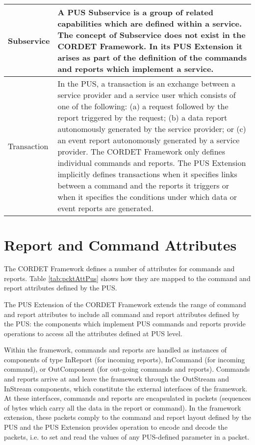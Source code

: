 \documentclass{pnp_article}
\begin{document}
\begin{longtable}{|l|>{\raggedright\arraybackslash}p{10cm}|}
\hline
Subservice & A PUS Subservice is a group of related capabilities which are defined within a service. The concept of Subservice does not exist in the CORDET Framework. In its PUS Extension it arises as part of the definition of the commands and reports which implement a service. \\
\hline
Transaction & In the PUS, a transaction is an exchange between a service provider and a service user which consists of one of the following: (a) a request followed by the report triggered by the request; (b) a data report autonomously generated by the service provider; or (c) an event report autonomously generated by a service provider. The CORDET Framework only defines individual commands and reports. The PUS Extension implicitly defines transactions when it specifies links between a command and the reports it triggers or when it specifies the conditions under which data or event reports are generated. \\
\hline
\end{longtable} 


\section{Report and Command Attributes}\label{sec:repCmdAttr}
The CORDET Framework defines a number of attributes for commands and reports. Table \ref{tab:pcktAttPus} shows how they are mapped to the command and report attributes defined by the PUS. 

The PUS Extension of the CORDET Framework extends the range of command and report attributes to include all command and report attributes defined by the PUS: the components which implement PUS commands and reports provide operations to access all the attributes defined at PUS level. 

Within the framework, commands and reports are handled as instances of components of type InReport (for incoming reports), InCommand (for incoming command), or OutComponent (for out-going commands and reports). Commands and reports arrive at and leave the framework through the OutStream and InStream components, which constitute the external interfaces of the framework. At these interfaces, commands and reports are encapsulated in packets (sequences of bytes which carry all the data in the report or command). In the framework extension, these packets comply to the command and report layout defined by the PUS and the PUS Extension provides operation to encode and decode the packets, i.e. to set and read the values of any PUS-defined parameter in a packet. 
\end{document}
